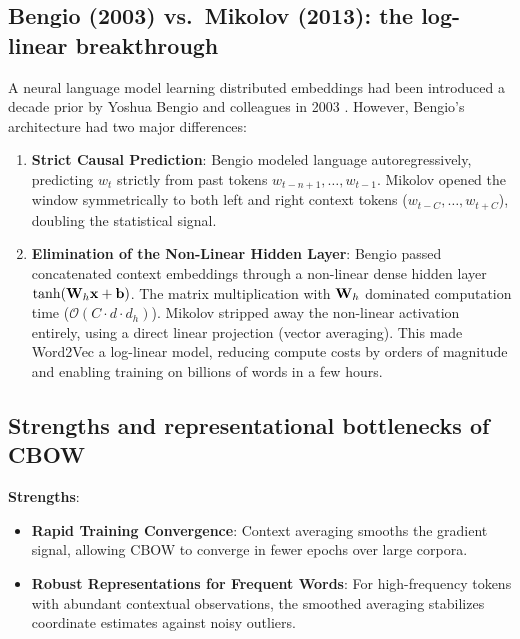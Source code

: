 \documentclass[../../main.tex]{subfiles}
\begin{document}
\subsection{Bengio (2003) vs.~Mikolov (2013): the log-linear breakthrough}
\label{subsec:bengio_vs_mikolov}

A neural language model learning distributed embeddings had been introduced a decade prior by Yoshua Bengio and colleagues in 2003 \cite{bengio2003}. However, Bengio's architecture had two major differences:
\begin{enumerate}
    \item \textbf{Strict Causal Prediction}: Bengio modeled language autoregressively, predicting $w_t$ strictly from past tokens $w_{t-n+1}, \dots, w_{t-1}$. Mikolov opened the window symmetrically to both left and right context tokens ($w_{t-C}, \dots, w_{t+C}$), doubling the statistical signal.
    \item \textbf{Elimination of the Non-Linear Hidden Layer}: Bengio passed concatenated context embeddings through a non-linear dense hidden layer $\tanh(\mathbf{W}_h \mathbf{x} + \mathbf{b})$. The matrix multiplication with $\mathbf{W}_h$ dominated computation time ($\mathcal{O}(C \cdot d \cdot d_h)$). Mikolov stripped away the non-linear activation entirely, using a direct linear projection (vector averaging). This made Word2Vec a log-linear model, reducing compute costs by orders of magnitude and enabling training on billions of words in a few hours.
\end{enumerate}

\subsection{Strengths and representational bottlenecks of CBOW}
\label{subsec:cbow_bottlenecks}

\noindent\textbf{Strengths}:
\begin{itemize}
    \item \textbf{Rapid Training Convergence}: Context averaging smooths the gradient signal, allowing CBOW to converge in fewer epochs over large corpora.
    \item \textbf{Robust Representations for Frequent Words}: For high-frequency tokens with abundant contextual observations, the smoothed averaging stabilizes coordinate estimates against noisy outliers.
\end{itemize}
\end{document}
